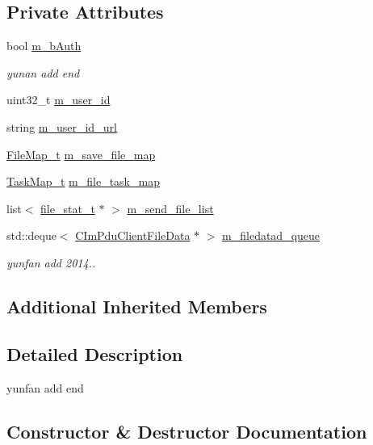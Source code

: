 \subsection*{Private Attributes}
\begin{DoxyCompactItemize}
\item 
bool \hyperlink{class_c_file_conn_ad58386b46f20db0b313eee70d7502961}{m\+\_\+b\+Auth}
\begin{DoxyCompactList}\small\item\em yunan add end \end{DoxyCompactList}\item 
uint32\+\_\+t \hyperlink{class_c_file_conn_a81d47e4080df874d7d325dd03953f8d9}{m\+\_\+user\+\_\+id}
\item 
string \hyperlink{class_c_file_conn_a3a193b87cde12d19a55915bdf46c6695}{m\+\_\+user\+\_\+id\+\_\+url}
\item 
\hyperlink{_file_conn_8h_a97254a81b327945dedc0bf8f0d5f18be}{File\+Map\+\_\+t} \hyperlink{class_c_file_conn_ae2890933bc02587bfb3595ab3fb7e922}{m\+\_\+save\+\_\+file\+\_\+map}
\item 
\hyperlink{_file_conn_8h_a74a192a456eb1d91b89db434bd54c3e4}{Task\+Map\+\_\+t} \hyperlink{class_c_file_conn_a2fcf9487a3579adb28c9584db14a63c8}{m\+\_\+file\+\_\+task\+\_\+map}
\item 
list$<$ \hyperlink{structfile__stat__t}{file\+\_\+stat\+\_\+t} $\ast$ $>$ \hyperlink{class_c_file_conn_a946a47abc253d214e4b2b43a2dcef683}{m\+\_\+send\+\_\+file\+\_\+list}
\item 
std\+::deque$<$ \hyperlink{class_c_im_pdu_client_file_data}{C\+Im\+Pdu\+Client\+File\+Data} $\ast$ $>$ \hyperlink{class_c_file_conn_a8e74bcaff86d11aa758e089837b67d82}{m\+\_\+filedatad\+\_\+queue}
\begin{DoxyCompactList}\small\item\em yunfan add 2014.. \end{DoxyCompactList}\end{DoxyCompactItemize}
\subsection*{Additional Inherited Members}


\subsection{Detailed Description}
yunfan add end 

\subsection{Constructor \& Destructor Documentation}
\hypertarget{class_c_file_conn_af588aac3e2633cab63e8752ca511f67c}{}
